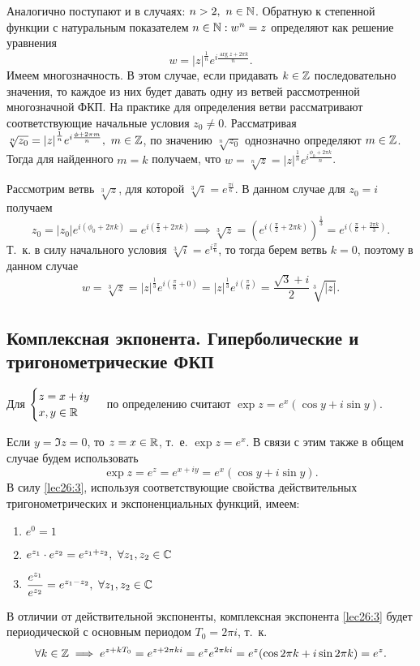 \documentclass[../../main.tex]{subfiles}
\begin{document}
Аналогично поступают и в случаях: $n > 2,\ n \in \mathbb{N}$.
Обратную к степенной функции с натуральным показателем $n \in \mathbb{N}: w^n = z$
определяют как решение уравнения
\[w = {|z|}^{\textstyle \frac{1}{n}}e^{i\frac{\arg z + 2 \pi k}{n}}.\]
Имеем многозначность. В этом случае, если придавать $k \in \mathbb{Z}$ последовательно
значения, то каждое из них будет давать одну из ветвей рассмотренной
многозначной ФКП. На практике для определения ветви рассматривают 
соответствующие начальные условия 
${z_0 \neq 0}$. Рассматривая $\sqrt[n]{z_0} = {|z|}^{\frac{1}{n}}e^{i
\frac{\phi + 2 \pi m}{n}},\ m \in \mathbb{Z}$, по значению 
$\sqrt[n]{z_0}$ однозначно определяют $m \in \mathbb{Z}$. Тогда для найденного 
$m=k$ получаем, что $w = \sqrt[n]{z} = |z|^{\textstyle 
\frac{1}{n}} e^{i \frac{\phi_0 + 2 \pi k}{n}}$.

\begin{example}
 Рассмотрим ветвь $\sqrt[3]{z}$, для которой 
 $\sqrt[3]{i} = e ^{\textstyle \frac{\pi i}{6}}$. В данном случае для 
 $z_0 = i$ получаем \[z_0 = |z_0| e^{\textstyle i(\phi_0 + 2 \pi k)} = 
 e^{\textstyle i(\frac{\pi}{2} + 2 \pi k)} \implies \sqrt[3]{z} = 
 \left(e^{\textstyle i(\frac{\pi}{2} + 2 \pi k)}\right)^{\textstyle 
 \frac{1}{3}} =
 e^{\textstyle i(\frac{\pi}{6} + \frac{2 \pi k}{3})}.\]
 Т.~к. в силу начального условия 
 $\sqrt[3]{i} = e ^{\textstyle i \frac{\pi}{6}}$, то тогда
 берем ветвь $k = 0$, 
 поэтому в данном случае \[w = \sqrt[3]{z}
 = {|z|}^{\tfrac{1}{3}}e ^{\textstyle i( \frac{\pi}{6} + 0)}
 = {|z|}^{\tfrac{1}{3}}e ^{\textstyle i( \frac{\pi}{6})} 
 = \frac{\sqrt{3} + i }{2} \sqrt[3]{|z|}.\]
\end{example}

\subsection{Комплексная экпонента. Гиперболические и тригонометрические ФКП}
Для 
$
\begin{cases}
 z = x + iy \\
 x, y \in \mathbb{R}
\end{cases}
$
по определению считают $\exp z = e^x(\cos y  + i \sin y) $.

Если $y = \Im z = 0$, то $z = x \in \mathbb{R}$, т.~е.
$\exp z = e^x$.
В связи с этим также в общем случае будем использовать
\begin{equation}
\label{lec26:3}
 \exp z = e^z = e^{x + iy} = e^{x}(\cos y + i \sin y).
\end{equation}
В силу \eqref{lec26:3}, используя соответствующие свойства действительных 
тригонометрических и экспоненциальных функций, имеем:
 \begin{enumerate}
    \item $e^0 = 1$
    \item $e^{z_1} \cdot e^{z_2} = e^{z_1 + z_2},\ \forall z_1, z_2 \in \mathbb{C}$
    \item $\dfrac{e^{z_1}}{e^{z_2}} = e^{z_1 - z_2},\ \forall z_1, z_2 \in \mathbb{C}$
 \end{enumerate}
В отличии от действительной экспоненты, комплексная экспонента \eqref{lec26:3} 
будет 
периодической с основным периодом $T_0 = 2\pi i$, т.~к.
\[\forall k \in \mathbb{Z} \implies e^{z + kT_0} = e^{z + 2 \pi k i} 
= e^{z} e^{2 \pi k i} = e^z(\cos{2 \pi k} + i \sin{2 \pi k}) = e^z.\]
\end{document}
